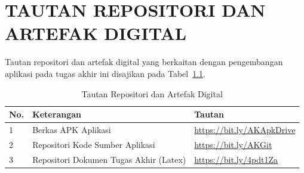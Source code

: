 \cleardoublepage
\chapter{TAUTAN REPOSITORI DAN ARTEFAK DIGITAL}
\label{chap:lampiran-d}

Tautan repositori dan artefak digital yang berkaitan dengan pengembangan aplikasi pada tugas akhir ini disajikan pada Tabel~\ref{tab:d-tautan}.

\begin{table}[H]
  \caption{Tautan Repositori dan Artefak Digital}
  \label{tab:d-tautan}
  \begin{tabularx}{\textwidth}{p{} p{} X}
    \toprule
    \textbf{No.} & \textbf{Keterangan} & \textbf{Tautan} \\
    \midrule
    1 & Berkas APK Aplikasi & \url{https://bit.ly/AKApkDrive} \\
    \midrule
    2 & Repositori Kode Sumber Aplikasi & \url{https://bit.ly/AKGit} \\
    \midrule
    3 & Repositori Dokumen Tugas Akhir (Latex) & \url{https://bit.ly/4pdt1Za} \\
    \bottomrule
  \end{tabularx}
\end{table}
